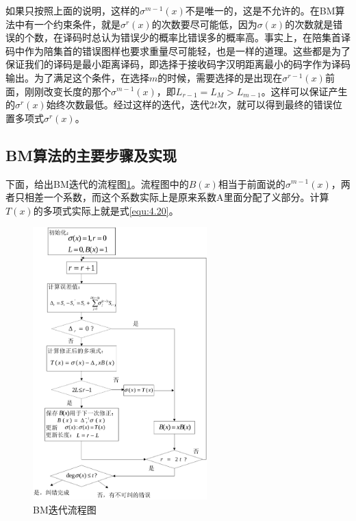 如果只按照上面的说明，这样的$\sigma^{m-1}(x)$不是唯一的，这是不允许的。在BM算法中有一个约束条件\cite{Cheng_BCH}，就是$\sigma^r(x)$的次数要尽可能低，因为$\sigma(x)$的次数就是错误的个数，在译码时总认为错误少的概率比错误多的概率高。事实上，在陪集首译码中作为陪集首的错误图样也要求重量尽可能轻，也是一样的道理。这些都是为了保证我们的译码是最小距离译码，即选择于接收码字汉明距离最小的码字作为译码输出。为了满足这个条件，在选择$m$的时候，需要选择的是出现在$\sigma^{r-1}(x)$前面，刚刚改变长度的那个$\sigma^{m-1}(x)$，即$L_{r-1}=L_M>L_{m-1}$。这样可以保证产生的$\sigma^r(x)$始终次数最低。经过这样的迭代，迭代$2t$次，就可以得到最终的错误位置多项式$\sigma^r(x)$。

\subsection{BM算法的主要步骤及实现\cite{Nadia_BCH}}
下面，给出BM迭代的流程图\ref{fig:4.4}。流程图中的$B(x)$相当于前面说的$\sigma^{m-1}(x)$，两者只相差一个系数，而这个系数实际上是原来系数A里面分配了义部分。计算$T(x)$的多项式实际上就是式\ref{equ:4.20}。
\begin{figure}[htbp]
  \begin{center}
    \includegraphics[width=0.6\textwidth]{images/BM1.pdf}
  \end{center}
  \caption{BM迭代流程图}
  \label{fig:4.4}
\end{figure}
